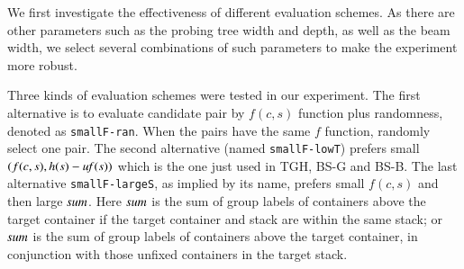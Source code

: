 \documentclass[review,3p,times,authoryear,12pt]{elsarticle}
\begin{document}
We first investigate the effectiveness of different evaluation schemes. As there are other parameters such as the probing tree width and depth, as well as the beam width, we select several combinations of such parameters to make the experiment more robust.

Three kinds of evaluation schemes were tested in our experiment. The first alternative is to evaluate candidate pair by $f(c,s)$ function plus randomness, denoted as \texttt{smallF-ran}. When the pairs have the same $f$ function, randomly select one pair. The second alternative (named \texttt{smallF-lowT}) prefers small $(f(c,s),h(s)-\id{uf}(s))$ which is the one just used in TGH, BS-G and BS-B. The last alternative \texttt{smallF-largeS}, as implied by its name, prefers small $f(c,s)$ and then large $\id{sum}$. Here $\id{sum}$ is the sum of group labels of containers above the target container if the target container and stack are within the same stack; or $\id{sum}$ is the sum of group labels of containers above the target container, in conjunction with those unfixed containers in the target stack.
\end{document}

